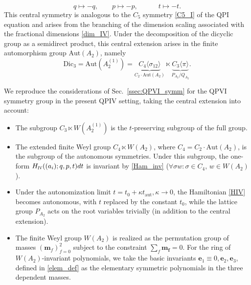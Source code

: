 \documentclass[12pt,a4paper]{article}
\numberwithin{equation}{section}
\newcommand{\IV}{\scalebox{.6}{IV}}
\begin{document}
\begin{equation}\label{C2_IV}
q\mapsto -q, \qquad p\mapsto -p, \qquad \quad  t\mapsto -t.
\end{equation}
This central symmetry is analogous to the $C_5$ symmetry \eqref{C5_I} of the QPI equation and arises from the branching of the dimension scaling associated with the fractional dimensions \eqref{dim_IV}.
Under the decomposition of the dicyclic group as a semidirect product, this central extension arises in the finite automorphism 
group $\mathrm{Aut}(A_2)$, namely
\begin{equation}
\mathrm{Dic}_3=\mathrm{Aut}\left(A_2^{(1)}\right)=\underbrace{C_4\langle\sigma_{12}\rangle}_{C_2\cdot\mathrm{Aut}(A_2)}\ltimes \underbrace{C_3\langle\pi\rangle}_{P_{A_2}/Q_{A_2}}.    
\end{equation}

We reproduce the considerations of Sec.~\ref{ssec:QPVI_symm} for the QPVI symmetry group in the present QPIV setting, taking the central extension into account:
\begin{itemize}
    \item The subgroup $C_3\ltimes W\left(A_2^{(1)}\right)$ is the $t$-preserving subgroup of the full group.
    \item The extended finite Weyl group $C_4\ltimes W(A_2)$, where $C_4=C_2\cdot \mathrm{Aut}(A_2)$, is the subgroup of the autonomous symmetries. Under this subgroup, the one-form $H_{\IV}((a_i);q,p,t)dt$ is invariant by \eqref{Ham_inv} ($\forall\sigma w: \sigma\in C_4, \, w\in W(A_2)$).
    \item  Under the autonomization limit $t=t_0+\kappa t_{\textrm{aut}}, \kappa\rightarrow0$, the Hamiltonian \eqref{HIV} becomes autonomous, with $t$ replaced by the constant $t_0$, while the lattice group $P_{A_2}$ acts on the root variables trivially (in addition to the central extension). 
    \item The finite Weyl group $W(A_2)$ is realized as the permutation group of masses $(\boldsymbol{m}_f)_{f=0}^2$ subject to the constraint $\sum_f\boldsymbol{m_f}=0$. For the ring of $W(A_2)$-invariant polynomials, we take the basic invariants $\boldsymbol{e}_1\equiv0,\boldsymbol{e}_2, \boldsymbol{e}_3$, defined in \eqref{elem_def} as the elementary symmetric polynomials in the three dependent masses.
\end{itemize}
\end{document}
